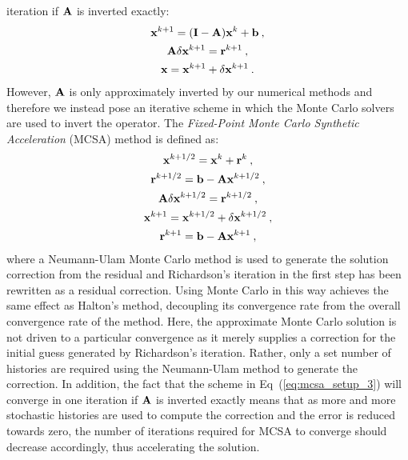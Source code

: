 iteration if $\mathbf{A}$ is inverted exactly:
\begin{subequations}
  \begin{gather}
    \mathbf{x}^{k+1} = (\mathbf{I} - \mathbf{A})\mathbf{x}^k + \mathbf{b}\:,\\
    \mathbf{A} \delta \mathbf{x}^{k+1} = \mathbf{r}^{k+1}\:,\\
    \mathbf{x} = \mathbf{x}^{k+1} + \delta \mathbf{x}^{k+1}\:.
  \end{gather}
  \label{eq:mcsa_setup_3}
\end{subequations}
However, $\mathbf{A}$ is only approximately inverted by our numerical
methods and therefore we instead pose an iterative scheme in which the
Monte Carlo solvers are used to invert the operator. The
\textit{Fixed-Point Monte Carlo Synthetic Acceleration} (MCSA) method
is defined as:
\begin{subequations}
  \begin{gather}
    \mathbf{x}^{k+1/2} = \mathbf{x}^k + \mathbf{r}^k\:,\\
    \mathbf{r}^{k+1/2} = \mathbf{b} - \mathbf{A}\mathbf{x}^{k+1/2}\:,\\
    \mathbf{A}\delta\mathbf{x}^{k+1/2} = \mathbf{r}^{k+1/2}\:,\\
    \mathbf{x}^{k+1} = \mathbf{x}^{k+1/2} + \delta \mathbf{x}^{k+1/2}\:,\\
    \mathbf{r}^{k+1} = \mathbf{b} - \mathbf{A}\mathbf{x}^{k+1}\:,
  \end{gather}
  \label{eq:mcsa}
\end{subequations}
where a Neumann-Ulam Monte Carlo method is used to generate the
solution correction from the residual and Richardson's iteration in
the first step has been rewritten as a residual correction. Using
Monte Carlo in this way achieves the same effect as Halton's method,
decoupling its convergence rate from the overall convergence rate of
the method. Here, the approximate Monte Carlo solution is not driven
to a particular convergence as it merely supplies a correction for the
initial guess generated by Richardson's iteration. Rather, only a set
number of histories are required using the Neumann-Ulam method to
generate the correction. In addition, the fact that the scheme in
Eq~(\ref{eq:mcsa_setup_3}) will converge in one iteration if $\mathbf{A}$
is inverted exactly means that as more and more stochastic histories
are used to compute the correction and the error is reduced towards
zero, the number of iterations required for MCSA to converge should
decrease accordingly, thus accelerating the solution.

